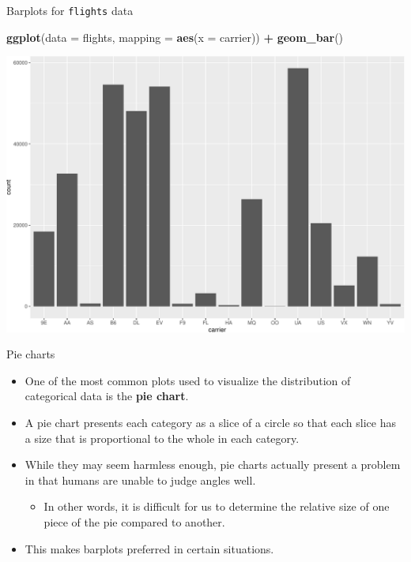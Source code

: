 \documentclass[
  ignorenonframetext,
]{beamer}
\newenvironment{Shaded}{\begin{snugshade}}{\end{snugshade}}
\newcommand{\AttributeTok}[1]{\textcolor[rgb]{0.13,0.29,0.53}{#1}}
\newcommand{\FunctionTok}[1]{\textcolor[rgb]{0.13,0.29,0.53}{\textbf{#1}}}
\newcommand{\NormalTok}[1]{#1}
\newcommand{\SpecialCharTok}[1]{\textcolor[rgb]{0.81,0.36,0.00}{\textbf{#1}}}
\providecommand{\tightlist}{%
  \setlength{\itemsep}{0pt}\setlength{\parskip}{0pt}}
\begin{document}
\begin{frame}[fragile]{Barplots for \texttt{flights} data}
\protect\hypertarget{barplots-for-flights-data-1}{}
\tiny

\begin{Shaded}
\begin{Highlighting}[]
\FunctionTok{ggplot}\NormalTok{(}\AttributeTok{data =}\NormalTok{ flights, }\AttributeTok{mapping =} \FunctionTok{aes}\NormalTok{(}\AttributeTok{x =}\NormalTok{ carrier)) }\SpecialCharTok{+}
  \FunctionTok{geom\_bar}\NormalTok{()}
\end{Highlighting}
\end{Shaded}

\begin{center}\includegraphics[width=0.9\linewidth,height=0.5\textheight]{Week2_files/figure-beamer/unnamed-chunk-40-1} \end{center}
\normalsize
\end{frame}

\begin{frame}{Pie charts}
\protect\hypertarget{pie-charts}{}
\begin{itemize}
\item
  One of the most common plots used to visualize the distribution of
  categorical data is the \textbf{pie chart}.
\item
  A pie chart presents each category as a slice of a circle so that each
  slice has a size that is proportional to the whole in each category.
\item
  While they may seem harmless enough, pie charts actually present a
  problem in that humans are unable to judge angles well.

  \begin{itemize}
  \tightlist
  \item
    In other words, it is difficult for us to determine the relative
    size of one piece of the pie compared to another.
  \end{itemize}
\item
  This makes barplots preferred in certain situations.
\end{itemize}
\end{frame}
\end{document}
